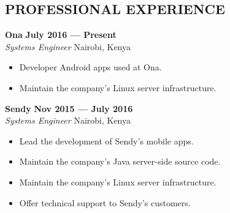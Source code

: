 \documentclass{res}
\begin{document}
\thispagestyle{empty} %

\address{P.O. Box 55050(00200) \\ Nairobi, Kenya \\ +254715023805}

\address{jasonrogena@gmail.com}

\address{https://github.com/jasonrogena}

 \begin{resume}

\section{PROFESSIONAL EXPERIENCE}

\vspace{8pt}
\textbf{Ona} \hfill        \textbf{July 2016 --- Present} \\
\emph{Systems Engineer}       \hfill  Nairobi, Kenya

\begin{itemize} \itemsep -2pt %
	\item Developer Android apps used at Ona.
	\item Maintain the company's Linux server infrastructure.
 \end{itemize} \vspace{-4pt}

\vspace{8pt}
\textbf{Sendy} \hfill        \textbf{Nov 2015 --- July 2016} \\
\emph{Systems Engineer}       \hfill Nairobi, Kenya

\begin{itemize} \itemsep -2pt %
	\item Lead the development of Sendy’s mobile apps.
	\item Maintain the company’s Java server-side source code.
          \item Maintain the company’s Linux server infrastructure.
	\item Offer technical support to Sendy’s customers.
 \end{itemize} \vspace{-4pt}


\end{resume}
\end{document}
